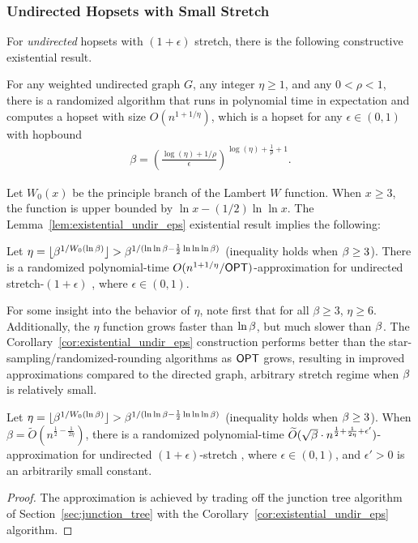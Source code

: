 \subsubsection{Undirected Hopsets with Small Stretch}
For \textit{undirected} hopsets with $(1+\epsilon)$ stretch, there is the following constructive existential result.

\begin{lemma} \label{lem:existential_undir_eps}
    For any weighted undirected graph $G$, any integer $\eta \geq 1$, and any $0 < \rho < 1$, there is a randomized algorithm that runs in polynomial time in expectation and computes a hopset with size $O(n^{1 + 1/\eta})$, which is a hopset for any $\epsilon \in (0,1)$ with hopbound
    \begin{align*}
        \beta = \left( \frac{\log(\eta) + 1/\rho }{\epsilon}   \right)^{\log(\eta) + \frac{1}{\rho}+1} .
    \end{align*}
\end{lemma}

Let $W_0(x)$ be the principle branch of the Lambert $W$ function. When $x \geq 3$, the function is upper bounded by $\ln{x} - (1/2) \ln{\ln{x}}$. The Lemma~\ref{lem:existential_undir_eps} existential result implies the following:

\begin{corollary} \label{cor:existential_undir_eps}
    Let $\eta = \lfloor \beta^{1/W_0(\ln{\beta})} \rfloor > \beta^{1/(\ln{\ln{\beta}}-\frac{1}{2}\ln{\ln{\ln{\beta}}})}$ (inequality holds when $\beta \geq 3$). There is a randomized polynomial-time $O(n^{1 + 1/\eta} / {{\sf OPT}})$-approximation for undirected stretch-$(1+\epsilon)$ {\hopset}, where $\epsilon \in (0,1)$.
\end{corollary}

For some insight into the behavior of $\eta$, note first that for all $\beta \geq 3$, $\eta \geq 6$. Additionally, the $\eta$ function grows faster than $\ln{\beta}$, but much slower than $\beta$. The Corollary~\ref{cor:existential_undir_eps} construction performs better than the star-sampling/randomized-rounding algorithms as ${\sf OPT}$ grows, resulting in improved approximations compared to the directed graph, arbitrary stretch regime when $\beta$ is relatively small. 


\begin{theorem} \label{thm:undir_eps}    
    Let $\eta = \lfloor \beta^{1/W_0(\ln{\beta})} \rfloor > \beta^{1/(\ln{\ln{\beta}}-\frac{1}{2}\ln{\ln{\ln{\beta}}})}$ (inequality holds when $\beta \geq 3$). When $\beta = \widetilde{O}(n^{\frac{1}{2} - \frac{1}{2\eta}})$, there is a randomized polynomial-time $\widetilde{O}(\sqrt{\beta} \cdot n^{\frac{1}{2} + \frac{1}{2\eta} + \epsilon'})$-approximation for undirected $(1+\epsilon)$-stretch {\hopset}, where $\epsilon \in (0,1)$, and $\epsilon' > 0$ is an arbitrarily small constant.
\end{theorem}
\begin{proof}
    The approximation is achieved by trading off the junction tree algorithm of Section~\ref{sec:junction_tree} with the Corollary~\ref{cor:existential_undir_eps} algorithm.
\end{proof}



